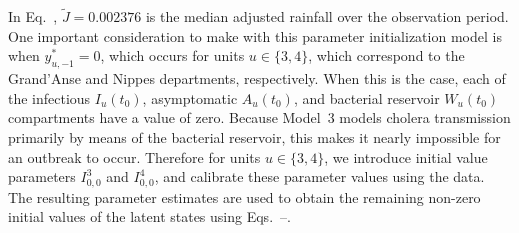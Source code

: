 In Eq.~, $\tilde{J} = 0.002376$ is the median adjusted rainfall over the observation period.
One important consideration to make with this parameter initialization model is when $y_{u, -1}^* = 0$, which occurs for units $u \in \{3, 4\}$, which correspond to the Grand'Anse and Nippes departments, respectively.
When this is the case, each of the infectious $I_u(t_0)$, asymptomatic $A_u(t_0)$, and bacterial reservoir $W_u(t_0)$ compartments have a value of zero.
Because Model~3 models cholera transmission primarily by means of the bacterial reservoir, this makes it nearly impossible for an outbreak to occur.
Therefore for units $u \in \{3, 4\}$, we introduce initial value parameters $I_{0,0}^3$ and $I_{0,0}^4$, and calibrate these parameter values using the data.
The resulting parameter estimates are used to obtain the remaining non-zero initial values of the latent states using Eqs.~--.
